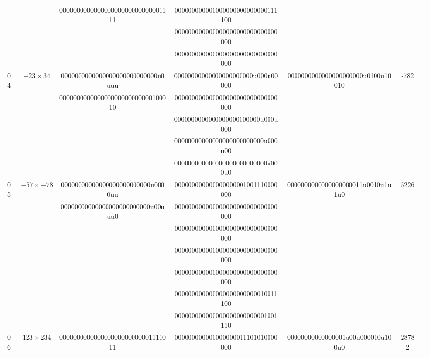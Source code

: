 \documentclass[electronics,article,accept,pdftex,moreauthors]{Definitions/mdpi}
\begin{document}
\begin{enumerate}[label={\arabic*).}]
\begin{table}[H]
{\begin{tabular}{lcccccc}
  &            &000000000000000000000000000001111&000000000000000000000000000111100&                                 &\\       
  &            &                                 &000000000000000000000000000000000&                                 &\\  
  &            &                                 &000000000000000000000000000000000&                                 &\\  
04&$-23\times34$&0000000000000000000000000000u0uuu&00000000000000000000000u000u00000&0000000000000000000000u0100u10010&-782\\
  &            &000000000000000000000000000100010&000000000000000000000000000000000&                                 &\\       
  &            &                                 &0000000000000000000000000u000u000&                                 &\\  
  &            &                                 &00000000000000000000000000u000u00&                                 &\\  
  &            &                                 &000000000000000000000000000u000u0&                                 &\\  
05&$-67\times-78$&00000000000000000000000000u0000uu&000000000000000000001001110000000&0000000000000000000011u0010u1u1u0&5226\\
  &            &00000000000000000000000000u00uuu0&000000000000000000000000000000000&                                 &\\       
  &            &                                 &000000000000000000000000000000000&                                 &\\  
  &            &                                 &000000000000000000000000000000000&                                 &\\  
  &            &                                 &000000000000000000000000000000000&                                 &\\  
  &            &                                 &000000000000000000000000010011100&                                 &\\  
  &            &                                 &000000000000000000000000001001110&                                 &\\  
06&$123\times234$&000000000000000000000000001111011&000000000000000000011101010000000&00000000000000001u00u000010u100u0&28782\\

\end{tabular}}
\end{table}
\end{enumerate}
\end{document}
